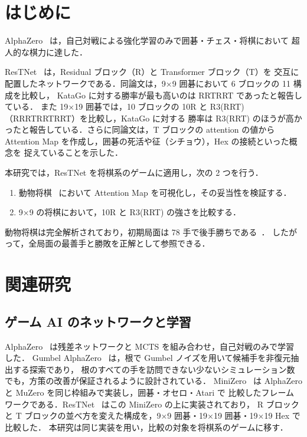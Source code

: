 \documentclass[a4paper,10pt,twocolumn]{ltjsarticle}
\newcommand{\todo}[1]{\textcolor{red}{\textbf{[TODO: #1]}}}
\begin{document}
\twocolumn[{%
\begin{center}
  {\LARGE\bfseries \todo{題目}}\\[6pt]
  {\large 横山 凜\qquad Wei Ting-Han}\\[2pt]
  {\normalsize 高知工科大学}\\[6pt]
\end{center}
}]

\section{はじめに}
AlphaZero~\cite{alphazero} は，自己対戦による強化学習のみで囲碁・チェス・将棋において
超人的な棋力に達した．

ResTNet~\cite{restnet} は，Residual ブロック（R）と Transformer ブロック（T）を
交互に配置したネットワークである．同論文は，9×9 囲碁において 6 ブロックの 11 構成を比較し，
KataGo に対する勝率が最も高いのは RRTRRT であったと報告している．
また 19×19 囲碁では，10 ブロックの 10R と R3(RRT)（RRRTRRTRRT）を比較し，KataGo に対する
勝率は R3(RRT) のほうが高かったと報告している．さらに同論文は，T ブロックの
attention の値から Attention Map を作成し，囲碁の死活や征（シチョウ），Hex の接続といった概念を
捉えていることを示した．

本研究では，ResTNet を将棋系のゲームに適用し，次の 2 つを行う．
\begin{enumerate}
  \item 動物将棋~\cite{tanaka2009} において Attention Map を可視化し，その妥当性を検証する．
  \item 9×9 の将棋において，10R と R3(RRT) の強さを比較する．
\end{enumerate}
動物将棋は完全解析されており，初期局面は 78 手で後手勝ちである~\cite{tanaka2009}．
したがって，全局面の最善手と勝敗を正解として参照できる．

\section{関連研究}
\subsection{ゲーム AI のネットワークと学習}
AlphaZero~\cite{alphazero} は残差ネットワークと MCTS を組み合わせ，自己対戦のみで学習した．
Gumbel AlphaZero~\cite{gumbel} は，根で Gumbel ノイズを用いて候補手を非復元抽出する探索であり，
根のすべての手を訪問できない少ないシミュレーション数でも，方策の改善が保証されるように設計されている．
MiniZero~\cite{minizero} は AlphaZero と MuZero を同じ枠組みで実装し，囲碁・オセロ・Atari で
比較したフレームワークである．ResTNet~\cite{restnet} はこの MiniZero の上に実装されており，
R ブロックと T ブロックの並べ方を変えた構成を，9×9 囲碁・19×19 囲碁・19×19 Hex で比較した．
本研究は同じ実装を用い，比較の対象を将棋系のゲームに移す．
\end{document}
